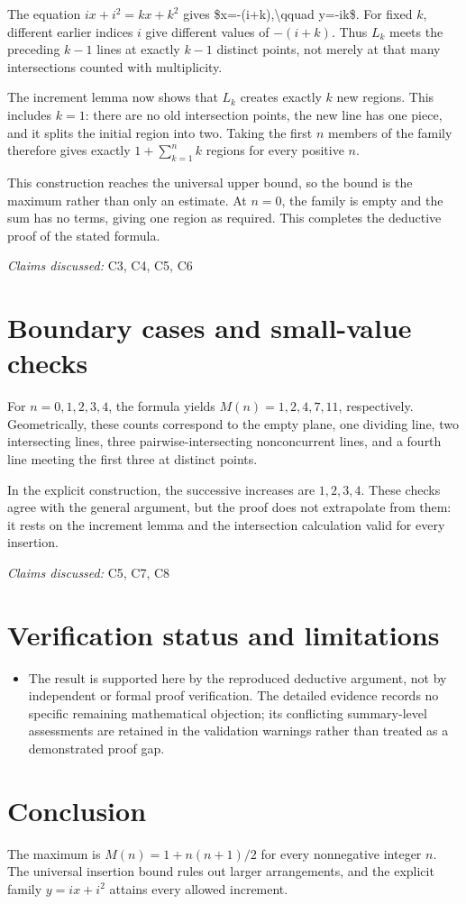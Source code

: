 \documentclass[11pt]{article}
\begin{document}
The equation $ix+i^2=kx+k^2$ gives
\$x=-(i+k),\textbackslash{}qquad y=-ik\$. For fixed $k$, different earlier indices $i$ give different values of $-(i+k)$. Thus $L_k$ meets the preceding $k-1$ lines at exactly $k-1$ distinct points, not merely at that many intersections counted with multiplicity.

The increment lemma now shows that $L_k$ creates exactly $k$ new regions. This includes $k=1$: there are no old intersection points, the new line has one piece, and it splits the initial region into two. Taking the first $n$ members of the family therefore gives exactly $1+\sum_{k=1}^{n}k$ regions for every positive $n$.

This construction reaches the universal upper bound, so the bound is the maximum rather than only an estimate. At $n=0$, the family is empty and the sum has no terms, giving one region as required. This completes the deductive proof of the stated formula.

\textit{Claims discussed: }C3, C4, C5, C6
\section{Boundary cases and small-value checks}
For $n=0,1,2,3,4$, the formula yields $M(n)=1,2,4,7,11$, respectively. Geometrically, these counts correspond to the empty plane, one dividing line, two intersecting lines, three pairwise-intersecting nonconcurrent lines, and a fourth line meeting the first three at distinct points.

In the explicit construction, the successive increases are $1,2,3,4$. These checks agree with the general argument, but the proof does not extrapolate from them: it rests on the increment lemma and the intersection calculation valid for every insertion.

\textit{Claims discussed: }C5, C7, C8
\section{Verification status and limitations}
\begin{itemize}
\item The result is supported here by the reproduced deductive argument, not by independent or formal proof verification. The detailed evidence records no specific remaining mathematical objection; its conflicting summary-level assessments are retained in the validation warnings rather than treated as a demonstrated proof gap.
\end{itemize}
\section{Conclusion}
The maximum is $M(n)=1+n(n+1)/2$ for every nonnegative integer $n$. The universal insertion bound rules out larger arrangements, and the explicit family $y=ix+i^2$ attains every allowed increment.
\end{document}
